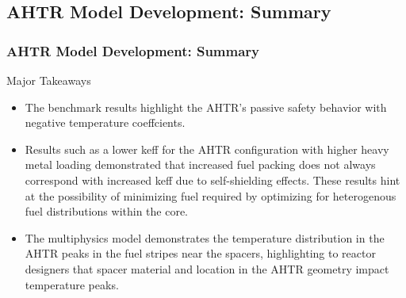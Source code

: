 \subsection{AHTR Model Development: Summary}
\begin{frame}
    \frametitle{AHTR Model Development: Summary}
    \begin{block}{Major Takeaways}
        \begin{itemize}
            \item The benchmark results highlight the AHTR's passive safety behavior with
            negative temperature coeffcients.
            \item Results such as a lower keff for the AHTR configuration with
            higher heavy metal loading demonstrated that increased fuel packing does not 
            always correspond with increased keff due to self-shielding effects. 
            These results hint at the possibility of minimizing fuel required by 
            optimizing for heterogenous fuel distributions within the core.
            \item The multiphysics model demonstrates the temperature distribution
            in the AHTR peaks in the fuel stripes near the spacers, highlighting to 
            reactor designers that spacer material and location in the AHTR geometry 
            impact temperature peaks.
        \end{itemize}
    \end{block}
\end{frame}
